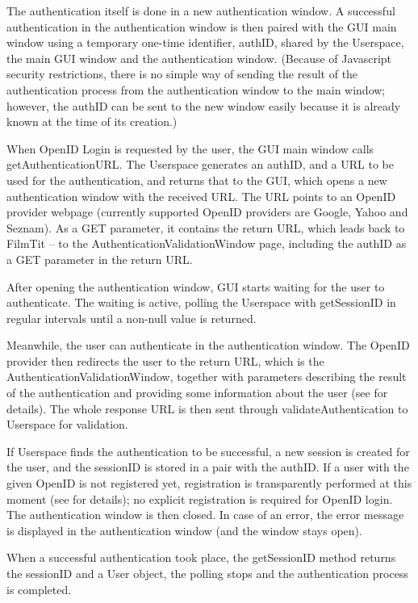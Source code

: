 The authentication itself is done in a new authentication window.
A successful authentication in the authentication window is then paired with the GUI main window using a temporary one-time identifier, authID, shared by the Userspace, the main GUI window and the authentication window.
(Because of Javascript security restrictions, there is no simple way of sending the result of the authentication process from the authentication window to the main window;
however, the authID can be sent to the new window easily because it is already known at the time of its creation.)

When OpenID Login is requested by the user, the GUI main window calls getAuthenticationURL.
The Userspace generates an authID, and a URL to be used for the authentication, and returns that to the GUI, which opens a new authentication window with the received URL.
The URL points to an OpenID provider webpage (currently supported OpenID providers are Google, Yahoo and Seznam). As a GET parameter, it contains the return URL, which leads back to FilmTit -- to the AuthenticationValidationWindow page, including the authID as a GET parameter in the return URL.

After opening the authentication window, GUI starts waiting for the user to authenticate. The waiting is active, polling the Userspace with getSessionID in regular intervals until a non-null value is returned.

Meanwhile, the user can authenticate in the authentication window. The OpenID provider then redirects the user to the return URL, which is the AuthenticationValidationWindow, together with parameters describing the result of the authentication and providing some information about the user (see  for details).
The whole response URL is then sent through validateAuthentication to Userspace for validation.

If Userspace finds the authentication to be successful, a new session is created for the user, and the sessionID is stored in a pair with the authID.
If a user with the given OpenID is not registered yet, registration is transparently performed at this moment (see  for details); no explicit registration is required for OpenID login.
The authentication window is then closed.
In case of an error, the error message is displayed in the authentication window (and the window stays open).

When a successful authentication took place, the getSessionID method returns the sessionID and a User object, the polling stops and the authentication process is completed.

